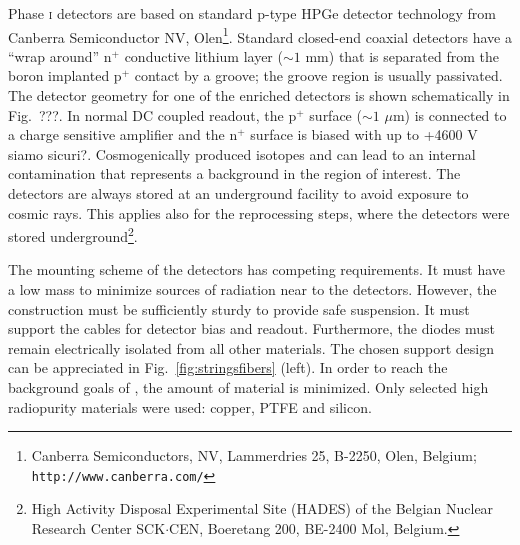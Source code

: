 Phase \textsc{i} detectors are based on standard p-type HPGe detector technology from Canberra Semiconductor NV, Olen\footnote{Canberra Semiconductors, NV, Lammerdries 25, B-2250, Olen, Belgium; \texttt{http://www.canberra.com/}}. Standard closed-end coaxial detectors have a ``wrap around'' $\text{n}^+$ conductive lithium layer ($\sim1$ mm) that is separated from the boron implanted $\text{p}^+$ contact by a groove; the groove region is usually passivated. The detector geometry for one of the enriched detectors is shown schematically in Fig.~???. In normal DC coupled readout, the p$^+$ surface ($\sim1$ $\mu$m) is connected to a charge sensitive amplifier and the n$^+$ surface is biased with up to +4600 V {\color{red}siamo sicuri?}. Cosmogenically produced isotopes  and  can lead to an internal contamination that represents a background in the region of interest. The detectors are always stored at an underground facility to avoid exposure to cosmic rays. This applies also for the reprocessing steps, where the detectors were stored underground\footnote{High Activity Disposal Experimental Site (HADES) of the Belgian Nuclear Research Center SCK$\cdot$CEN, Boeretang 200, BE-2400 Mol, Belgium.}.

The mounting scheme of the detectors has competing requirements. It must have a low mass to minimize sources of radiation near to the detectors. However, the construction must be sufficiently sturdy to provide safe suspension. It must support the cables for detector bias and readout. Furthermore, the diodes must remain electrically isolated from all other materials. The chosen support design can be appreciated in Fig.~\ref{fig:stringsfibers} (left). In order to reach the background goals of {\gerda}, the amount of material is minimized. Only selected high radiopurity materials were used: copper, PTFE and silicon.

